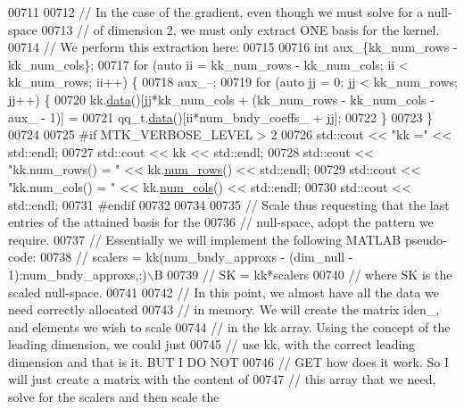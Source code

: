 \begin{DoxyCode}
{{00711 
00712   \textcolor{comment}{// In the case of the gradient, even though we must solve for a null-space}
00713   \textcolor{comment}{// of dimension 2, we must only extract ONE basis for the kernel.}
00714   \textcolor{comment}{// We perform this extraction here:}
00715 
00716   \textcolor{keywordtype}{int} aux\_\{kk\_num\_rows - kk\_num\_cols\};
00717   \textcolor{keywordflow}{for} (\textcolor{keyword}{auto} ii = kk\_num\_rows - kk\_num\_cols; ii < kk\_num\_rows; ii++) \{
00718     aux\_--;
00719     \textcolor{keywordflow}{for} (\textcolor{keyword}{auto} jj = 0; jj < kk\_num\_rows; jj++) \{
00720       kk.\hyperlink{classmtk_1_1DenseMatrix_a0c33b8a9e01d157c61ddbdf807c25d84}{data}()[jj*kk\_num\_cols + (kk\_num\_rows - kk\_num\_cols - aux\_ - 1)] =
00721         qq\_t.\hyperlink{classmtk_1_1DenseMatrix_a0c33b8a9e01d157c61ddbdf807c25d84}{data}()[ii*num\_bndy\_coeffs\_ + jj];
00722     \}
00723   \}
00724 
00725 \textcolor{preprocessor}{  #if MTK\_VERBOSE\_LEVEL > 2}
00726   std::cout << \textcolor{stringliteral}{"kk ="} << std::endl;
00727   std::cout << kk << std::endl;
00728   std::cout << \textcolor{stringliteral}{"kk.num\_rows() = "} << kk.\hyperlink{classmtk_1_1DenseMatrix_a53f3afb3b6a8d21854458aaa9663cc74}{num\_rows}() << std::endl;
00729   std::cout << \textcolor{stringliteral}{"kk.num\_cols() = "} << kk.\hyperlink{classmtk_1_1DenseMatrix_a41747502d468c6728a4be31501b16e0e}{num\_cols}() << std::endl;
00730   std::cout << std::endl;
00731 \textcolor{preprocessor}{  #endif}
00732 
00734 
00735   \textcolor{comment}{// Scale thus requesting that the last entries of the attained basis for the}
00736   \textcolor{comment}{// null-space, adopt the pattern we require.}
00737   \textcolor{comment}{// Essentially we will implement the following MATLAB pseudo-code:}
00738   \textcolor{comment}{//  scalers = kk(num\_bndy\_approxs - (dim\_null - 1):num\_bndy\_approxs,:)\(\backslash\)B}
00739   \textcolor{comment}{//  SK = kk*scalers}
00740   \textcolor{comment}{// where SK is the scaled null-space.}
00741 
00742   \textcolor{comment}{// In this point, we almost have all the data we need correctly allocated}
00743   \textcolor{comment}{// in memory. We will create the matrix iden\_, and elements we wish to scale}
00744   \textcolor{comment}{// in the kk array. Using the concept of the leading dimension, we could just}
00745   \textcolor{comment}{// use kk, with the correct leading dimension and that is it. BUT I DO NOT}
00746   \textcolor{comment}{// GET how does it work. So I will just create a matrix with the content of}
00747   \textcolor{comment}{// this array that we need, solve for the scalers and then scale the}
}}
\end{DoxyCode}
